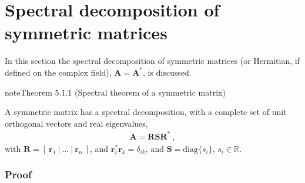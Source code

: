 \documentclass[letterpaper,10pt,english]{jupyterBook}
\begin{document}
\sphinxstepscope


\section{Spectral decomposition of symmetric matrices}
\label{\detokenize{ch/linear-algebra/spectral-symmetric:spectral-decomposition-of-symmetric-matrices}}\label{\detokenize{ch/linear-algebra/spectral-symmetric:math-spectral-symmetric}}\label{\detokenize{ch/linear-algebra/spectral-symmetric::doc}}
\sphinxAtStartPar
In this section the spectral decomposition of symmetric matrices (or Hermitian, if defined on the complex field), \(\mathbf{A} = \mathbf{A}^*\), is discussed.
\label{ch/linear-algebra/spectral-symmetric:theorem-0}
\begin{sphinxadmonition}{note}{Theorem 5.1.1 (Spectral theorem of a symmetric matrix)}



\sphinxAtStartPar
A symmetric matrix has a spectral decomposition, with a complete set of unit orthogonal vectors and real eigenvalues,
\begin{equation*}
\begin{split}\mathbf{A} = \mathbf{R} \mathbf{S} \mathbf{R}^* \ ,\end{split}
\end{equation*}
\sphinxAtStartPar
with \(\mathbf{R} = \left[ \ \mathbf{r}_1 \ | \ \dots \ | \ \mathbf{r}_n \ \right]\), and \(\mathbf{r}_i^* \mathbf{r}_k = \delta_{ik}\), and \(\mathbf{S} = \text{diag}\{ s_i \}\), \(s_i \in \mathbb{R}\).
\end{sphinxadmonition}
\subsubsection*{Proof}
\end{document}
